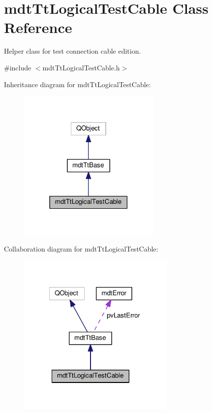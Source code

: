 \hypertarget{classmdt_tt_logical_test_cable}{\section{mdt\-Tt\-Logical\-Test\-Cable Class Reference}
\label{classmdt_tt_logical_test_cable}
}


Helper class for test connection cable edition.  




{\ttfamily \#include $<$mdt\-Tt\-Logical\-Test\-Cable.\-h$>$}



Inheritance diagram for mdt\-Tt\-Logical\-Test\-Cable\-:
\nopagebreak
\begin{figure}[H]
\begin{center}
\leavevmode
\includegraphics[width=198pt]{classmdt_tt_logical_test_cable__inherit__graph}
\end{center}
\end{figure}


Collaboration diagram for mdt\-Tt\-Logical\-Test\-Cable\-:
\nopagebreak
\begin{figure}[H]
\begin{center}
\leavevmode
\includegraphics[width=218pt]{classmdt_tt_logical_test_cable__coll__graph}
\end{center}
\end{figure}
